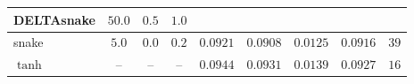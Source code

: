 \begin{table}[htbp!]
\begin{tabular}{l|c|c|c||c|c|c|c|c}
\hline
 \cellcolor{red!30} DELTAsnake &  \cellcolor{red!30} $50.0$ &  \cellcolor{red!30} $0.5$ &  \cellcolor{red!30} $1.0$ &  \cellcolor{red!30} \cellcolor{red!30}$\ $ & \cellcolor{red!30} $\ $ & \cellcolor{red!30} $\ $ & \cellcolor{red!30} $\ $ & \cellcolor{red!30} $\ $\\
\hline
 snake &  $5.0$ &  $0.0$ &  $0.2$ & $0.0921$ & $0.0908$ & $0.0125$ & $0.0916$ & $39$\\
\hline
 $\tanh$ &  -- &  -- &  -- & $0.0944$ & $0.0931$ & $0.0139$ & $0.0927$ & $16$\\
\hline
\end{tabular}
\label{tab:hyperparam_opt_activation}
\end{table}
